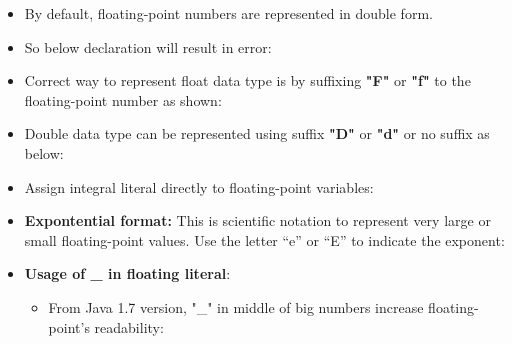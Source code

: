 
\begin{flushleft}

	\begin{itemize}
		
		\item By default, floating-point numbers are represented in double form.
		\item So below declaration will result in error: 
		\bigskip		
		\bigskip		
		
		\item Correct way to represent float data type is by suffixing \textbf{"F"} or \textbf{"f"} to the floating-point number as shown:
		\bigskip

		\item Double data type can be represented using suffix \textbf{"D"} or \textbf{"d"} or no suffix as below:
		\bigskip
	
		\item Assign integral literal directly to floating-point variables:
		\bigskip
			
		\item \textbf{Expontential format:} This is scientific notation to represent very large or small floating-point values. Use the letter “e” or “E” to indicate the exponent:
				\bigskip
		
		\bigskip
		\item \textbf{Usage of \_ in floating literal}:
		\begin{itemize}
			\item From Java 1.7 version, "\_" in middle of big numbers increase floating-point's readability:
						
		\end{itemize}	
		
	\end{itemize}
	
\end{flushleft}


